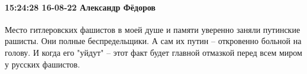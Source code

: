  
 
 
 
 

\paragraph{15:24:28 16-08-22 Александр Фёдоров}

\obeycr
Место гитлеровских фашистов в моей душе и памяти уверенно заняли путинские рашисты. 
Они полные беспредельщики. А сам их путин -- откровенно больной на голову. 
И когда его "уйдут" -- этот факт будет главной отмазкой перед всем миром у русских фашистов.
\restorecr
